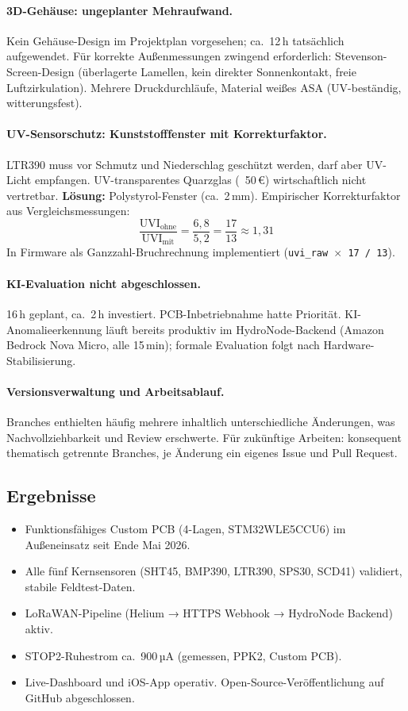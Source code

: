 \documentclass[11pt,a4paper]{scrartcl}
\begin{document}
\paragraph{3D-Gehäuse: ungeplanter Mehraufwand.}
Kein Gehäuse-Design im Projektplan vorgesehen; ca.~12\,h tatsächlich aufgewendet. Für korrekte Außenmessungen zwingend erforderlich: Stevenson-Screen-Design (überlagerte Lamellen, kein direkter Sonnenkontakt, freie Luftzirkulation). Mehrere Druckdurchläufe, Material weißes ASA (UV-beständig, witterungsfest).

\paragraph{UV-Sensorschutz: Kunststofffenster mit Korrekturfaktor.}
LTR390 muss vor Schmutz und Niederschlag geschützt werden, darf aber UV-Licht empfangen. UV-transparentes Quarzglas (~50\,€) wirtschaftlich nicht vertretbar. \textbf{Lösung:} Polystyrol-Fenster (ca.~2\,mm). Empirischer Korrekturfaktor aus Vergleichsmessungen:
\[ \frac{\text{UVI}_{\text{ohne}}}{\text{UVI}_{\text{mit}}} = \frac{6{,}8}{5{,}2} = \frac{17}{13} \approx 1{,}31 \]
In Firmware als Ganzzahl-Bruchrechnung implementiert (\texttt{uvi\_raw $\times$ 17 / 13}).

\paragraph{KI-Evaluation nicht abgeschlossen.}
16\,h geplant, ca.~2\,h investiert. PCB-Inbetriebnahme hatte Priorität. KI-Anomalieerkennung läuft bereits produktiv im HydroNode-Backend (Amazon Bedrock Nova Micro, alle 15\,min); formale Evaluation folgt nach Hardware-Stabilisierung.

\paragraph{Versionsverwaltung und Arbeitsablauf.}
Branches enthielten häufig mehrere inhaltlich unterschiedliche Änderungen, was Nachvollziehbarkeit und Review erschwerte. Für zukünftige Arbeiten: konsequent thematisch getrennte Branches, je Änderung ein eigenes Issue und Pull Request.

\subsection*{Ergebnisse}

\begin{itemize}
  \item Funktionsfähiges Custom PCB (4-Lagen, STM32WLE5CCU6) im Außeneinsatz seit Ende Mai 2026.
  \item Alle fünf Kernsensoren (SHT45, BMP390, LTR390, SPS30, SCD41) validiert, stabile Feldtest-Daten.
  \item LoRaWAN-Pipeline (Helium → HTTPS Webhook → HydroNode Backend) aktiv.
  \item STOP2-Ruhestrom ca.~900\,µA (gemessen, PPK2, Custom PCB).
  \item Live-Dashboard und iOS-App operativ. Open-Source-Veröffentlichung auf GitHub abgeschlossen.
\end{itemize}
\end{document}
